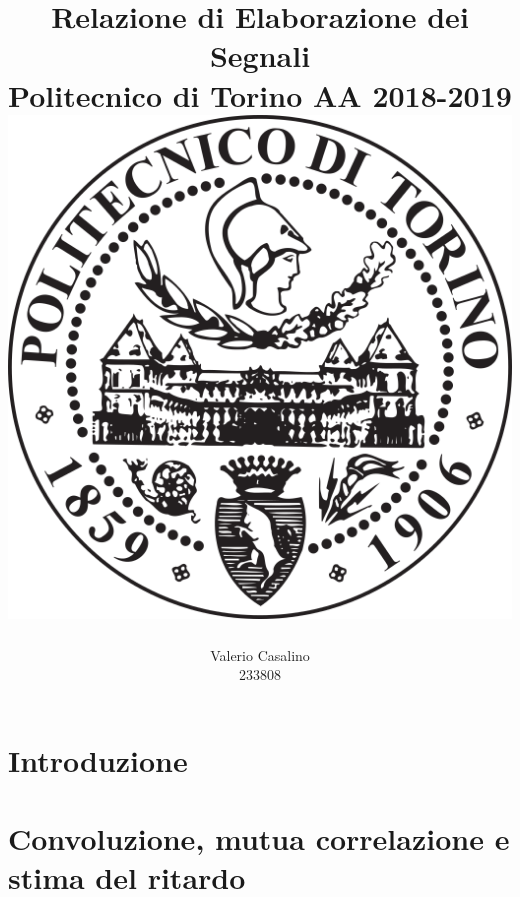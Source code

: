 \documentclass[12pt, openany, a4paper]{report}
\author{
\LARGE
Valerio Casalino \\ 
\LARGE
233808 
}
\title{ 
\Huge
\textbf{Relazione di Elaborazione dei Segnali} \\ 
\LARGE
Politecnico di Torino AA 2018-2019 \\
\vspace*{2cm} \includegraphics[width=.5\textwidth]{images/logo.png}
}
\date{}
\begin{document}
\maketitle

\cleardoublepage
\tableofcontents

\chapter{Introduzione}


\chapter{Convoluzione, mutua correlazione e stima del ritardo}

\end{document}
